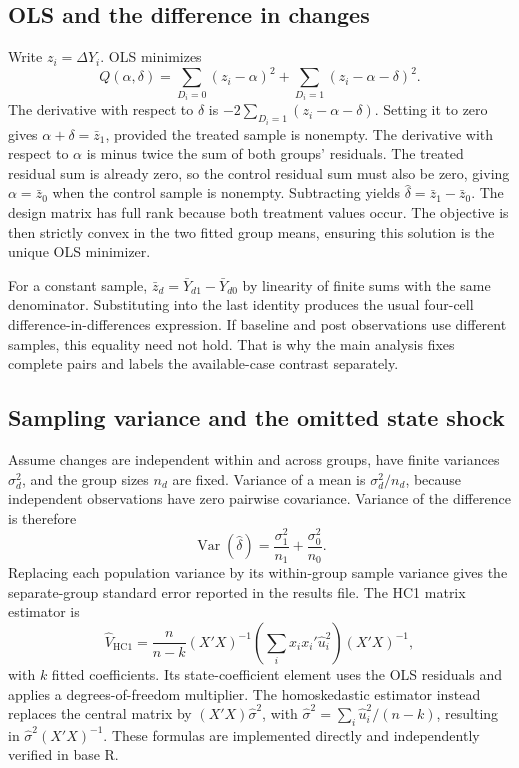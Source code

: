 \documentclass[11pt]{article}
\begin{document}
\subsection{OLS and the difference in changes}
Write $z_i=\Delta Y_i$. OLS minimizes
\begin{equation}
Q(\alpha,\delta)=\sum_{D_i=0}(z_i-\alpha)^2
 +\sum_{D_i=1}(z_i-\alpha-\delta)^2.
\end{equation}
The derivative with respect to $\delta$ is $-2\sum_{D_i=1}(z_i-\alpha-\delta)$. Setting it to zero gives $\alpha+\delta=\bar z_1$, provided the treated sample is nonempty. The derivative with respect to $\alpha$ is minus twice the sum of both groups' residuals. The treated residual sum is already zero, so the control residual sum must also be zero, giving $\alpha=\bar z_0$ when the control sample is nonempty. Subtracting yields $\widehat\delta=\bar z_1-\bar z_0$. The design matrix has full rank because both treatment values occur. The objective is then strictly convex in the two fitted group means, ensuring this solution is the unique OLS minimizer. %

For a constant sample, $\bar z_d=\bar Y_{d1}-\bar Y_{d0}$ by linearity of finite sums with the same denominator. Substituting into the last identity produces the usual four-cell difference-in-differences expression. If baseline and post observations use different samples, this equality need not hold. That is why the main analysis fixes complete pairs and labels the available-case contrast separately. %

\subsection{Sampling variance and the omitted state shock}
Assume changes are independent within and across groups, have finite variances $\sigma_d^2$, and the group sizes $n_d$ are fixed. Variance of a mean is $\sigma_d^2/n_d$, because independent observations have zero pairwise covariance. Variance of the difference is therefore
\begin{equation}
\operatorname{Var}(\widehat\delta)=\frac{\sigma_1^2}{n_1}
 +\frac{\sigma_0^2}{n_0}.
\end{equation}
Replacing each population variance by its within-group sample variance gives the separate-group standard error reported in the results file. The HC1 matrix estimator is
\begin{equation}
\widehat V_{\mathrm{HC1}}
=\frac{n}{n-k}(X'X)^{-1}
 \left(\sum_i x_i x_i'\widehat u_i^2\right)(X'X)^{-1},
\end{equation}
with $k$ fitted coefficients. Its state-coefficient element uses the OLS residuals and applies a degrees-of-freedom multiplier. The homoskedastic estimator instead replaces the central matrix by $(X'X)\widehat\sigma^2$, with $\widehat\sigma^2=\sum_i\widehat u_i^2/(n-k)$, resulting in $\widehat\sigma^2(X'X)^{-1}$. These formulas are implemented directly and independently verified in base R. %
\end{document}
